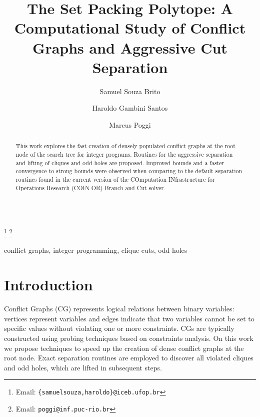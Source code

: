 \documentclass{endm}
\begin{document}
  

\begin{verbatim}\end{verbatim}\vspace{2.5cm}

\begin{frontmatter}

\title{The Set Packing Polytope: A Computational Study of Conflict Graphs and Aggressive Cut Separation}
\author{Samuel Souza Brito \and Haroldo Gambini Santos}
\address{{\small Departamento de Computação, Universidade Federal de Ouro Preto - UFOP}}
\author{Marcus Poggi}
\address{{\small Dep. de Informática, Pontifícia Universidade Católica do Rio de Janeiro}}
\thanks[mailSamuelHaroldo]{Email: {\texttt{\normalshape \{samuelsouza,haroldo\}@iceb.ufop.br}}} 
\thanks[mailPoggi]{Email: {\texttt{\normalshape poggi@inf.puc-rio.br}}}  

\begin{abstract}
This work explores the fast creation of densely populated conflict graphs at the root node of the search tree for integer programs. Routines for the aggressive separation and lifting of cliques and odd-holes are proposed. Improved bounds and a faster convergence to strong bounds were observed when comparing to the default separation routines found in the current version of the COmputation INfrastructure for Operations Research (COIN-OR) Branch and Cut solver.
\end{abstract}

\begin{keyword}
conflict graphs, integer programming, clique cuts, odd holes
\end{keyword}

\end{frontmatter}


\section{Introduction}\label{intro}

Conflict Graphs (CG) represents logical relations between binary variables: vertices represent variables and edges indicate that two variables cannot be set to specific values without violating one or more constraints. CGs are typically constructed using probing techniques\cite{Borndorfer1998} based on constraints analysis. On this work we propose techniques to speed up the creation of dense conflict graphs at the root node. Exact separation routines are employed to discover all violated cliques and odd holes, which are lifted in subsequent steps.
\end{document}
